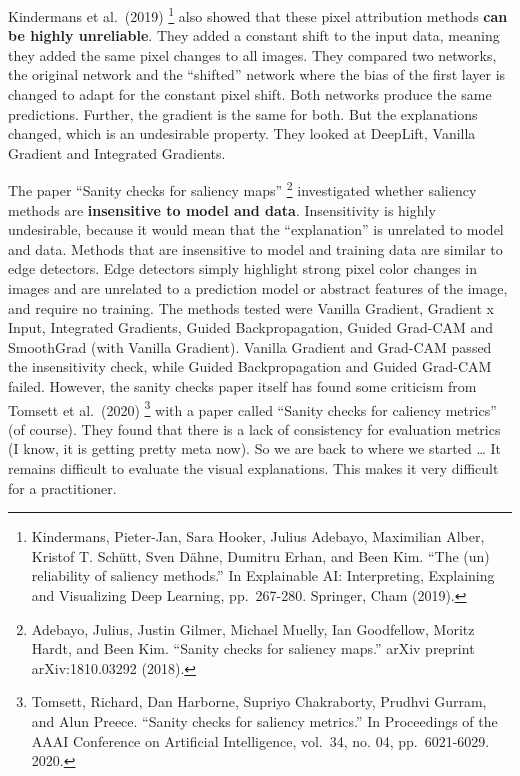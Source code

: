 \documentclass[
  10pt,
]{scrbook}
\begin{document}
Kindermans et al.~(2019) \footnote{Kindermans, Pieter-Jan, Sara Hooker, Julius Adebayo, Maximilian Alber, Kristof T. Schütt, Sven Dähne, Dumitru Erhan, and Been Kim. ``The (un) reliability of saliency methods.'' In Explainable AI: Interpreting, Explaining and Visualizing Deep Learning, pp.~267-280. Springer, Cham (2019).} also showed that these pixel attribution methods \textbf{can be highly unreliable}.
They added a constant shift to the input data, meaning they added the same pixel changes to all images.
They compared two networks, the original network and the ``shifted'' network where the bias of the first layer is changed to adapt for the constant pixel shift.
Both networks produce the same predictions.
Further, the gradient is the same for both.
But the explanations changed, which is an undesirable property.
They looked at DeepLift, Vanilla Gradient and Integrated Gradients.

The paper ``Sanity checks for saliency maps'' \footnote{Adebayo, Julius, Justin Gilmer, Michael Muelly, Ian Goodfellow, Moritz Hardt, and Been Kim. ``Sanity checks for saliency maps.'' arXiv preprint arXiv:1810.03292 (2018).} investigated whether saliency methods are \textbf{insensitive to model and data}.
Insensitivity is highly undesirable, because it would mean that the ``explanation'' is unrelated to model and data.
Methods that are insensitive to model and training data are similar to edge detectors.
Edge detectors simply highlight strong pixel color changes in images and are unrelated to a prediction model or abstract features of the image, and require no training.
The methods tested were Vanilla Gradient, Gradient x Input, Integrated Gradients, Guided Backpropagation, Guided Grad-CAM and SmoothGrad (with Vanilla Gradient).
Vanilla Gradient and Grad-CAM passed the insensitivity check, while Guided Backpropagation and Guided Grad-CAM failed.
However, the sanity checks paper itself has found some criticism from Tomsett et al.~(2020) \footnote{Tomsett, Richard, Dan Harborne, Supriyo Chakraborty, Prudhvi Gurram, and Alun Preece. ``Sanity checks for saliency metrics.'' In Proceedings of the AAAI Conference on Artificial Intelligence, vol.~34, no. 04, pp.~6021-6029. 2020.} with a paper called ``Sanity checks for caliency metrics'' (of course).
They found that there is a lack of consistency for evaluation metrics (I know, it is getting pretty meta now).
So we are back to where we started \ldots{} It remains difficult to evaluate the visual explanations.
This makes it very difficult for a practitioner.
\end{document}
